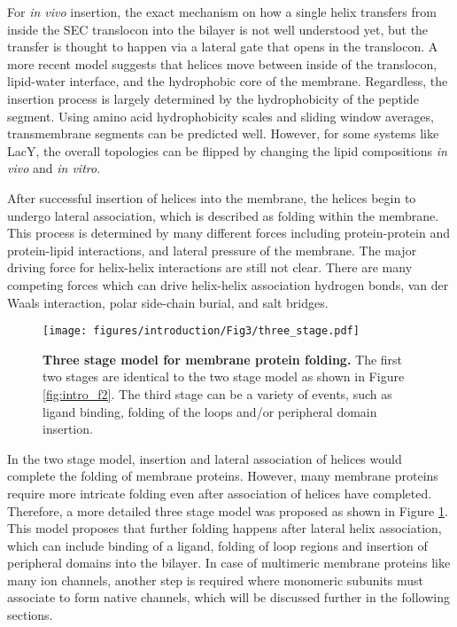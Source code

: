 For \textit{in vivo} insertion, the exact mechanism on how a single helix transfers from inside the SEC translocon into the bilayer is not well understood yet, but the transfer is thought to happen via a lateral gate that opens in the translocon. A more recent model suggests that helices move between inside of the translocon, lipid-water interface, and the hydrophobic core of the membrane. Regardless, the insertion process is largely determined by the hydrophobicity of the peptide segment. Using amino acid hydrophobicity scales and sliding window averages, transmembrane segments can be predicted well. However, for some systems like LacY, the overall topologies can be flipped by changing the lipid compositions \textit{in vivo} and \textit{in vitro}. \cite{bogdanov2010, vitrac2013, vitrac2015}

After successful insertion of helices into the membrane, the helices begin to undergo lateral association, which is described as folding within the membrane. This process is determined by many different forces including protein-protein and protein-lipid interactions, and lateral pressure of the membrane. The major driving force for helix-helix interactions are still not clear. There are many competing forces which can drive helix-helix association hydrogen bonds, van der Waals interaction, polar side-chain burial, and salt bridges.


\begin{figure}[!ht]
\begin{center}
	\texttt{[image: figures/introduction/Fig3/three\_stage.pdf]}
\end{center}
	\caption{\textbf{Three stage model for membrane protein folding.} The first two stages are identical to the two stage model as shown in Figure \ref{fig:intro_f2}. The third stage can be a variety of events, such as ligand binding, folding of the loops and/or peripheral domain insertion.}
	\label{fig:intro_f3}
\end{figure}

In the two stage model, insertion and lateral association of helices would complete the folding of membrane proteins. However, many membrane proteins require more intricate folding even after association of helices have completed. Therefore, a more detailed three stage model was proposed as shown in Figure \ref{fig:intro_f3}. \cite{engelman2003} This model proposes that further folding happens after lateral helix association, which can include binding of a ligand, folding of loop regions and insertion of peripheral domains into the bilayer. In case of multimeric membrane proteins like many ion channels, another step is required where monomeric subunits must associate to form native channels, which will be discussed further in the following sections. 


